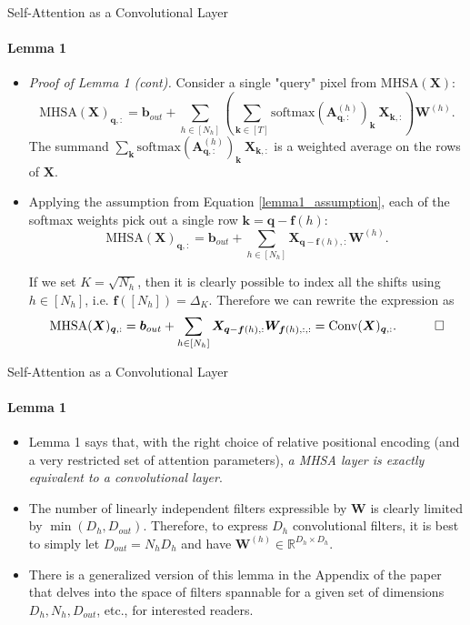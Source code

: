 \documentclass[9pt]{beamer}
\newcommand{\bb}{\mathbb}
\newcommand{\mb}{\bm}
\begin{document}
\newcommand{\row}[1]{_{#1,:}}
\begin{frame}{Self-Attention as a Convolutional Layer}
\framesubtitle{Lemma 1}
\begin{itemize}
\item \textit{Proof of Lemma 1 (cont).} Consider a single "query" pixel from $\mathrm{MHSA}(\bm X)$:
\begin{equation}
    \mathrm{MHSA}(\mb X)\row {\mb q} = \mb b_{out} + 
        \sum_{h\in[N_h]} \left( \sum_{\mb k\in [T]} 
            \mathrm{softmax}(\mb A^{(h)}\row {\mb q})_{\mb k}\ \mb X\row{\mb k} 
        \right) \mb W^{(h)} .
\end{equation}
The summand $\sum_{\mb k} \mathrm{softmax}(\mb A^{(h)}\row {\mb q})_{\mb k}\ \mb X\row{\mb k}$ is a weighted average on the rows of $\bm X$. 

\item Applying the assumption from Equation \eqref{lemma1_assumption}, each of the softmax weights pick out a single row $\bm k = \bm q - \bm f(h)$:
\begin{equation}
    \mathrm{MHSA}(\mb X)\row {\mb q} = \mb b_{out} + 
        \sum_{h\in[N_h]}  \mb X\row{\mb q - \mb f(h)} \mb W^{(h)} .
\end{equation}

If we set $K=\sqrt{N_h}$, then it is clearly possible to index all the shifts using $h\in[N_h]$, i.e. $\bm f([N_h]) = \Delta_K$. Therefore we can rewrite the expression as
\begin{equation}
    \mathrm{MHSA}(\mb X)\row {\mb q} = \mb b_{out} + 
        \sum_{h\in[N_h]}  \mb X\row{\mb q - \mb f(h)} \mb W_{\mb f(h), :, :} 
        = \mathrm{Conv}(\mb X)\row{\mb q}. 
    \quad\qed
\end{equation}
\end{itemize}
\end{frame}


\begin{frame}{Self-Attention as a Convolutional Layer}
\framesubtitle{Lemma 1}
\begin{itemize}
\item Lemma 1 says that, with the right choice of relative positional encoding (and a very restricted set of attention parameters), {\em a MHSA layer is exactly equivalent to a convolutional layer}.

\vspace{.1in}
\item The number of linearly independent filters expressible by $\bm W$ is clearly limited by $\min(D_h, D_{out})$. Therefore, to express $D_h$ convolutional filters, it is best to simply let $D_{out} = N_hD_h$ and have $\bm W^{(h)}\in\bb R^{D_h\times D_h}$. 

\vspace{.1in}
\item There is a generalized version of this lemma in the Appendix of the paper that delves into the space of filters spannable for a given set of dimensions $D_h, N_h, D_{out}$, etc., for interested readers.
\end{itemize}
\end{frame}
\end{document}

